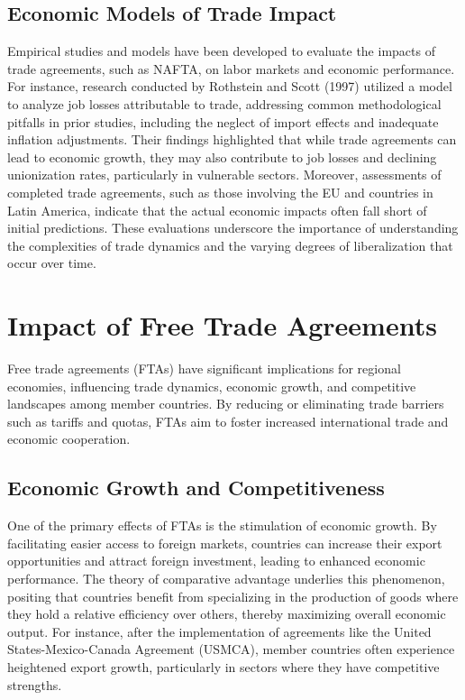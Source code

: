 \documentclass[12pt]{article}
\begin{document}
\subsection{Economic Models of Trade Impact}
Empirical studies and models have been developed to evaluate the impacts of trade agreements, such as NAFTA, on labor markets and economic performance. For instance, research conducted by Rothstein and Scott (1997) utilized a model to analyze job losses attributable to trade, addressing common methodological pitfalls in prior studies, including the neglect of import effects and inadequate inflation adjustments. Their findings highlighted that while trade agreements can lead to economic growth, they may also contribute to job losses and declining unionization rates, particularly in vulnerable sectors.  Moreover, assessments of completed trade agreements, such as those involving the EU and countries in Latin America, indicate that the actual economic impacts often fall short of initial predictions. These evaluations underscore the importance of understanding the complexities of trade dynamics and the varying degrees of liberalization that occur over time.



\section{Impact of Free Trade Agreements}
Free trade agreements (FTAs) have significant implications for regional economies, influencing trade dynamics, economic growth, and competitive landscapes among member countries. By reducing or eliminating trade barriers such as tariffs and quotas, FTAs aim to foster increased international trade and economic cooperation.

\subsection{Economic Growth and Competitiveness}
One of the primary effects of FTAs is the stimulation of economic growth. By facilitating easier access to foreign markets, countries can increase their export opportunities and attract foreign investment, leading to enhanced economic performance.  The theory of comparative advantage underlies this phenomenon, positing that countries benefit from specializing in the production of goods where they hold a relative efficiency over others, thereby maximizing overall economic output. For instance, after the implementation of agreements like the United States-Mexico-Canada Agreement (USMCA), member countries often experience heightened export growth, particularly in sectors where they have competitive strengths.
\end{document}
